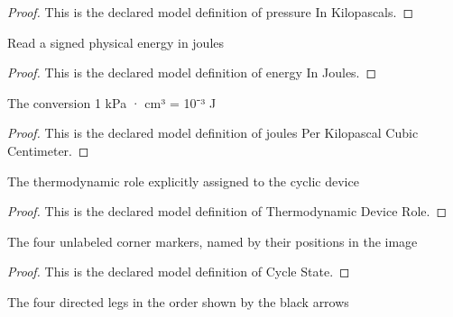 \begin{proof}
  This is the declared model definition of pressure In Kilopascals.
\end{proof}
\begin{definition}
  \label{def:physics:phyx-mini-0419:phyxminiproblems-problemphyxmini0419-energyinjoules}
  Read a signed physical energy in joules
\end{definition}
\begin{proof}
  This is the declared model definition of energy In Joules.
\end{proof}
\begin{definition}
  \label{def:physics:phyx-mini-0419:phyxminiproblems-problemphyxmini0419-joulesperkilopascalcubiccentimeter}
  The conversion 1 kPa · cm³ = 10⁻³ J
\end{definition}
\begin{proof}
  This is the declared model definition of joules Per Kilopascal Cubic Centimeter.
\end{proof}
\begin{definition}
  \label{def:physics:phyx-mini-0419:phyxminiproblems-problemphyxmini0419-thermodynamicdevicerole}
  The thermodynamic role explicitly assigned to the cyclic device
\end{definition}
\begin{proof}
  This is the declared model definition of Thermodynamic Device Role.
\end{proof}
\begin{definition}
  \label{def:physics:phyx-mini-0419:phyxminiproblems-problemphyxmini0419-cyclestate}
  The four unlabeled corner markers, named by their positions in the image
\end{definition}
\begin{proof}
  This is the declared model definition of Cycle State.
\end{proof}
\begin{definition}
  \label{def:physics:phyx-mini-0419:phyxminiproblems-problemphyxmini0419-cycleleg}
  The four directed legs in the order shown by the black arrows
\end{definition}
